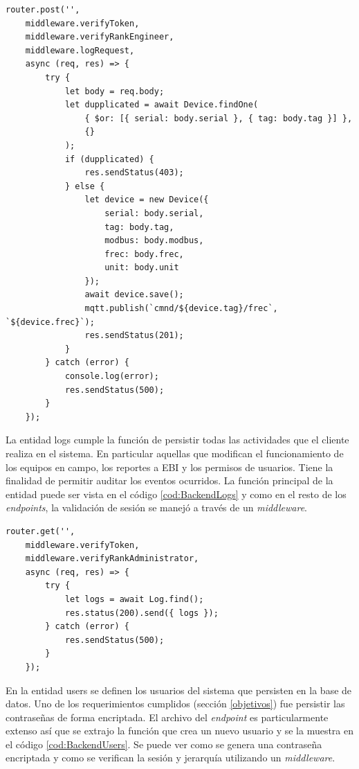 \begin{lstlisting}[label=cod:BackendDevices,caption=Creación de dispositivo de la entidad devices]
router.post('',
    middleware.verifyToken,
    middleware.verifyRankEngineer,
    middleware.logRequest,
    async (req, res) => {
        try {
            let body = req.body;
            let dupplicated = await Device.findOne(
                { $or: [{ serial: body.serial }, { tag: body.tag }] },
                {}
            );
            if (dupplicated) {
                res.sendStatus(403);
            } else {
                let device = new Device({
                    serial: body.serial,
                    tag: body.tag,
                    modbus: body.modbus,
                    frec: body.frec,
                    unit: body.unit
                });
                await device.save();
                mqtt.publish(`cmnd/${device.tag}/frec`, `${device.frec}`);
                res.sendStatus(201);
            }
        } catch (error) {
            console.log(error);
            res.sendStatus(500);
        }
    });
\end{lstlisting}

La entidad logs cumple la función de persistir todas las actividades que el cliente realiza en el sistema.
En particular aquellas que modifican el funcionamiento de los equipos en campo, los reportes a EBI y los permisos de usuarios.
Tiene la finalidad de permitir auditar los eventos ocurridos.
La función principal de la entidad puede ser vista en el código \ref{cod:BackendLogs} y como en el resto de los \emph{endpoints}, la validación de sesión se manejó a través de un \emph{middleware}.

\begin{lstlisting}[label=cod:BackendLogs,caption=Función principal de la entidad logs]
router.get('',
    middleware.verifyToken,
    middleware.verifyRankAdministrator,
    async (req, res) => {
        try {
            let logs = await Log.find();
            res.status(200).send({ logs });
        } catch (error) {
            res.sendStatus(500);
        }
    });
\end{lstlisting}

En la entidad users se definen los usuarios del sistema que persisten en la base de datos.
Uno de los requerimientos cumplidos (sección \ref{objetivos}) fue persistir las contraseñas de forma encriptada.
El archivo del \emph{endpoint} es particularmente extenso así que se extrajo la función que crea un nuevo usuario y se la muestra en el código \ref{cod:BackendUsers}.
Se puede ver como se genera una contraseña encriptada y como se verifican la sesión y jerarquía utilizando un \emph{middleware}.

